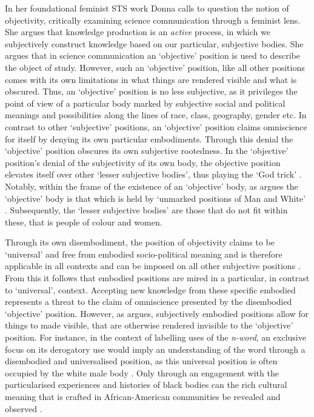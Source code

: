 In her foundational feminist STS work Donna \citet{Haraway:1988} calls to question the notion of objectivity, critically examining science communication through a feminist lens.
She argues that knowledge production is an \textit{active} process, in which we subjectively construct knowledge based on our particular, subjective bodies.
She argues that in science communication an `objective' position is used to describe the object of study.
However, such an `objective' position, like all other positions comes with its own limitations in what things are rendered visible and what is obscured. 
Thus, an `objective' position is no less subjective, as it privileges the point of view of a particular body marked by subjective social and political meanings and possibilities along the lines of race, class, geography, gender etc. 
In contrast to other `subjective' positions, an `objective' position claims omniscience for itself by denying its own particular embodiments. 
Through this denial the `objective' position obscures its own subjective rootedness.
In the `objective' position's denial of the subjectivity of its own body, the objective position elevates itself over other `lesser subjective bodies', thus playing the `God trick' \citep{Haraway:1988}.
Notably, within the frame of the existence of an `objective' body, as \citet{Haraway:1988} argues the `objective' body is that which is held by `unmarked positions of Man and White' \cite[p. 8]{Haraway:1988}.
Subsequently, the `lesser subjective bodies' are those that do not fit within these, that is people of colour and women.

Through its own disembodiment, the position of objectivity claims to be `universal' and free from embodied socio-political meaning and is therefore applicable in all contexts and can be imposed on all other subjective positions \citep{Mohanty:1984}.
From this it follows that embodied positions are mired in a particular, in contrast to `universal', context.
Accepting new knowledge from these specific embodied represents a threat to the claim of omniscience presented by the disembodied `objective' position.
However, as \citet{Haraway:1988} argues, subjectively embodied positions allow for things to made visible, that are otherwise rendered invisible to the `objective' position.
For instance, in the context of labelling uses of the \textit{n-word}, an exclusive focus on its derogatory use would imply an understanding of the word through a disembodied and universalised position, as this universal position is often occupied by the white male body \citep{Haraway:1988}.
Only through an engagement with the particularised experiences and histories of black bodies can the rich cultural meaning that is crafted in African-American communities be revealed and observed \citep{Rahman:2012}.


